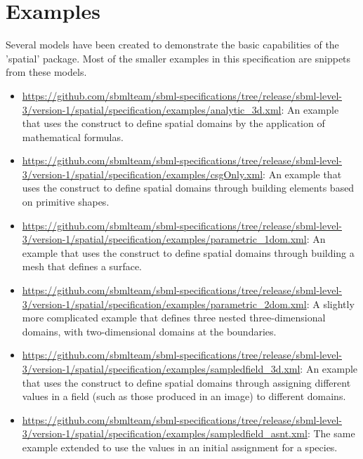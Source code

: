 
\section{Examples}
\label{examples}

Several models have been created to demonstrate the basic capabilities of the 'spatial' package.  Most of the smaller examples in this specification are snippets from these models.

\begin{itemize}
  
\item \url{https://github.com/sbmlteam/sbml-specifications/tree/release/sbml-level-3/version-1/spatial/specification/examples/analytic_3d.xml}: An example that uses the \AnalyticGeometry construct to define spatial domains by the application of mathematical formulas.

\item \url{https://github.com/sbmlteam/sbml-specifications/tree/release/sbml-level-3/version-1/spatial/specification/examples/csgOnly.xml}: An example that uses the \CSGeometry construct to define spatial domains through building elements based on primitive shapes.

\item \url{https://github.com/sbmlteam/sbml-specifications/tree/release/sbml-level-3/version-1/spatial/specification/examples/parametric_1dom.xml}: An example that uses the \ParametricGeometry construct to define spatial domains through building a mesh that defines a surface.

\item \url{https://github.com/sbmlteam/sbml-specifications/tree/release/sbml-level-3/version-1/spatial/specification/examples/parametric_2dom.xml}: A slightly more complicated \ParametricGeometry example that defines three nested three-dimensional domains, with two-dimensional domains at the boundaries.

\item \url{https://github.com/sbmlteam/sbml-specifications/tree/release/sbml-level-3/version-1/spatial/specification/examples/sampledfield_3d.xml}: An example that uses the \SampledFieldGeometry construct to define spatial domains through assigning different values in a field (such as those produced in an image) to different domains.

\item \url{https://github.com/sbmlteam/sbml-specifications/tree/release/sbml-level-3/version-1/spatial/specification/examples/sampledfield_asnt.xml}: The same \SampledFieldGeometry example extended to use the \SampledField values in an initial assignment for a species.

\end{itemize}
